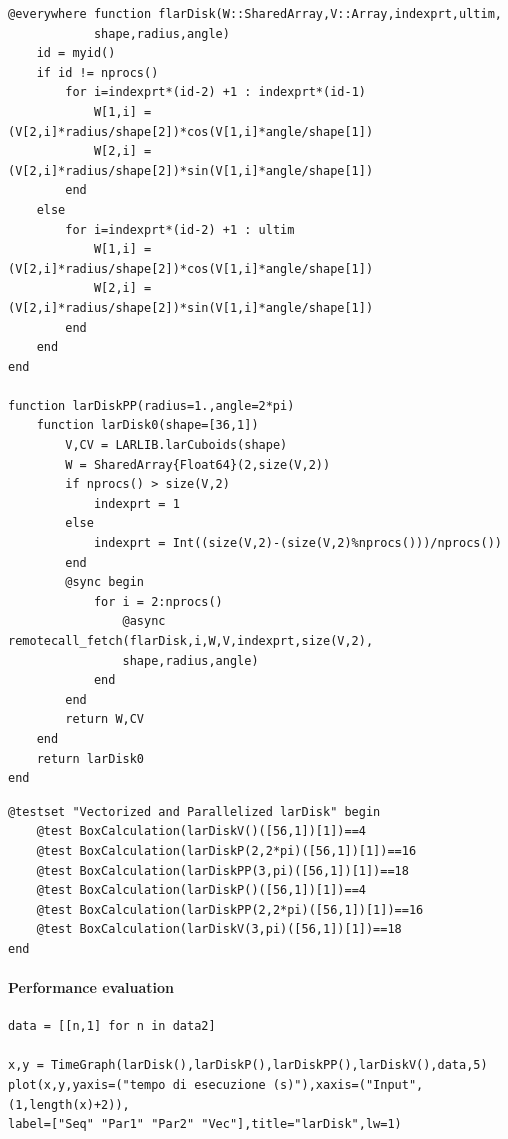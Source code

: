 \documentclass{article}
\begin{document}
\begin{Verbatim}
@everywhere function flarDisk(W::SharedArray,V::Array,indexprt,ultim,
            shape,radius,angle)
    id = myid()
    if id != nprocs()
        for i=indexprt*(id-2) +1 : indexprt*(id-1)
            W[1,i] = (V[2,i]*radius/shape[2])*cos(V[1,i]*angle/shape[1])
            W[2,i] = (V[2,i]*radius/shape[2])*sin(V[1,i]*angle/shape[1])  
        end
    else
        for i=indexprt*(id-2) +1 : ultim
            W[1,i] = (V[2,i]*radius/shape[2])*cos(V[1,i]*angle/shape[1])
            W[2,i] = (V[2,i]*radius/shape[2])*sin(V[1,i]*angle/shape[1])
        end
    end
end

function larDiskPP(radius=1.,angle=2*pi)
    function larDisk0(shape=[36,1])
        V,CV = LARLIB.larCuboids(shape)
        W = SharedArray{Float64}(2,size(V,2))
        if nprocs() > size(V,2)
            indexprt = 1
        else
            indexprt = Int((size(V,2)-(size(V,2)%nprocs()))/nprocs())
        end
        @sync begin
            for i = 2:nprocs()
                @async remotecall_fetch(flarDisk,i,W,V,indexprt,size(V,2),
                shape,radius,angle)
            end
        end
        return W,CV
    end
    return larDisk0    
end
\end{Verbatim}

\begin{Verbatim}
@testset "Vectorized and Parallelized larDisk" begin
    @test BoxCalculation(larDiskV()([56,1])[1])==4
    @test BoxCalculation(larDiskP(2,2*pi)([56,1])[1])==16
    @test BoxCalculation(larDiskPP(3,pi)([56,1])[1])==18
    @test BoxCalculation(larDiskP()([56,1])[1])==4
    @test BoxCalculation(larDiskPP(2,2*pi)([56,1])[1])==16
    @test BoxCalculation(larDiskV(3,pi)([56,1])[1])==18 
end
\end{Verbatim}

\paragraph{Performance evaluation}

\begin{Verbatim}
data = [[n,1] for n in data2]

x,y = TimeGraph(larDisk(),larDiskP(),larDiskPP(),larDiskV(),data,5)
plot(x,y,yaxis=("tempo di esecuzione (s)"),xaxis=("Input",(1,length(x)+2)),
label=["Seq" "Par1" "Par2" "Vec"],title="larDisk",lw=1)

\end{Verbatim}
\end{document}
